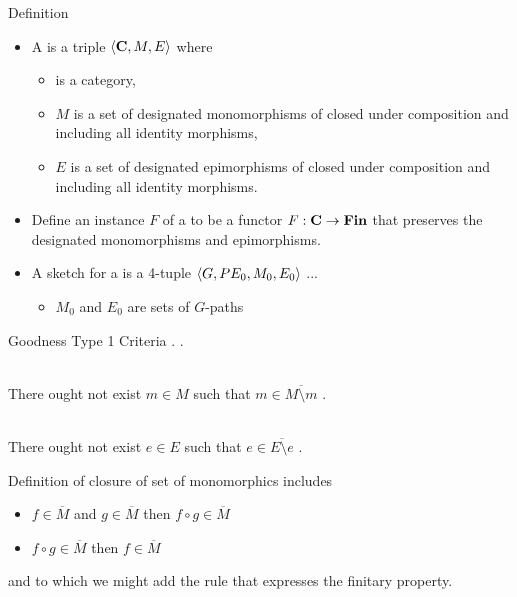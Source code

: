 


\begin{frame}{Definition}
\begin{itemize}
\item A \term{\catMEterm} is a triple $\langle\textbf{C},M,E\rangle$ where 
\begin{itemize}
\item \catcw is a category,
\item $M$ is a set of designated monomorphisms of \catcw closed under composition and including all identity morphisms,
\item $E$ is a set of designated epimorphisms of \catcw closed under composition and including all identity morphisms.
\end{itemize}
\item Define an instance $F$ of a \catMEterm to be a functor $F: \textbf{C} \rightarrow \textbf{Fin}$ 
that preserves the designated monomorphisms and epimorphisms.


\item A sketch for a \catMEterm is a 4-tuple $\langle G,PE_0,M_0,E_0\rangle$ ...
\begin{itemize}
 \item   $M_0$ and $E_0$ are sets of $G$-paths  
\end{itemize}
\end{itemize}
\end{frame}


\begin{frame}{Goodness Type 1 Criteria}
\medskip
\goodnessoneA.
\medskip
\goodnessoneB.

\newcommand{\goodnessoneC}{
\goodnesscriteria{1C} \\
There ought not exist $m \in M$ such that $m \in \overline{M \setminus m}$
}
\newcommand{\goodnessoneD}{
\goodnesscriteria{1D} \\
There ought not exist $e \in E$ such that $e \in \overline{E \setminus e}$
}

\goodnessoneC. \\
\medskip
\goodnessoneD. \\
\medskip

Definition of closure of set of monomorphics includes
\begin{itemize}
\item $f \in \overline{M}$ and $g \in \overline{M}$ then $f \circ g \in \overline{M}$
\item $f \circ g \in \overline{M}$ then $f \in \overline{M}$
\end{itemize}
and to which we might add the rule that expresses the finitary property.
\end{frame}

